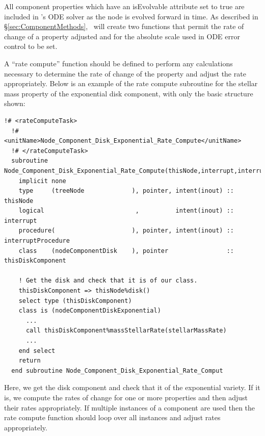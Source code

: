 All component properties which have an {\normalfont \ttfamily isEvolvable} attribute set to {\normalfont \ttfamily true} are included in \glc's ODE solver as the node is evolved forward in time. As described in \S\ref{sec:ComponentMethods}, \glc\ will create two functions that permit the rate of change of a property adjusted and for the absolute scale used in ODE error control to be set.

A ``rate compute'' function should be defined to perform any calculations necessary to determine the rate of change of the property and adjust the rate appropriately. Below is an example of the rate compute subroutine for the stellar mass property of the exponential disk component, with only the basic structure shown:
\begin{lstlisting}[escapechar=@,breaklines,prebreak=\&,postbreak=\&]
  !# <rateComputeTask>
  !#  <unitName>Node_Component_Disk_Exponential_Rate_Compute</unitName>
  !# </rateComputeTask>
  subroutine Node_Component_Disk_Exponential_Rate_Compute(thisNode,interrupt,interruptProcedure)
    implicit none
    type     (treeNode             ), pointer, intent(inout) :: thisNode
    logical                         ,          intent(inout) :: interrupt
    procedure(                     ), pointer, intent(inout) :: interruptProcedure
    class    (nodeComponentDisk    ), pointer                :: thisDiskComponent
 
    ! Get the disk and check that it is of our class.
    thisDiskComponent => thisNode%disk()
    select type (thisDiskComponent)
    class is (nodeComponentDiskExponential)
      ...
      call thisDiskComponent%massStellarRate(stellarMassRate)
      ...
    end select
    return
  end subroutine Node_Component_Disk_Exponential_Rate_Comput
\end{lstlisting}
Here, we get the disk component and check that it of the {\normalfont \ttfamily exponential} variety. If it is, we compute the rates of change for one or more properties and then adjust their rates appropriately. If multiple instances of a component are used then the rate compute function should loop over all instances and adjust rates appropriately.

